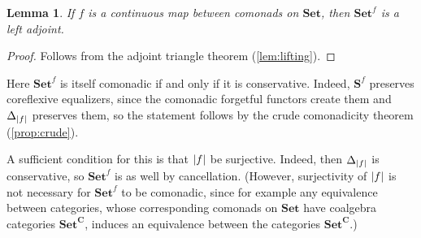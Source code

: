 \documentclass[11pt, oneside, article]{memoir}
\theoremstyle{plain}
\newtheorem{lemma}[theorem]{Lemma}
\theoremstyle{definition}
\theoremstyle{remark}
\newenvironment{remark}
{\renewcommand\qedsymbol{$\lrcorner$}%
  \pushQED{\qed}\myremark}
{\popQED\endmyremark}
\DeclarePairedDelimiter{\abs}{\lvert}{\rvert}
\newcommand{\namedcat}[1]{\mathbf{#1}}
\newcommand{\cat}[1]{\mathbf{#1}}
\newcommand{\Set}{\namedcat{Set}}
\newcommand{\pts}[1]{{\abs{#1}}}
\newcommand{\one}[1]{\pts{#1}}
\newcommand{\reindex}[1]{\Delta_{#1}}
\newcommand{\con}[2]{{#1}^{#2}}
\newcommand{\cmnd}[1]{{#1}}
\newcommand{\xX}{X}
\newcommand{\xY}{Y}
\newcommand{\cC}{\cmnd{C}}
\newcommand{\cD}{\cmnd{D}}
\newcommand{\bC}{\cat{C}}
\newcommand{\bS}{\cat{S}}
\begin{document}

\begin{lemma}\label{lem:conleft}
  If $f$ is a continuous map between comonads on $\Set$, then
  $\con{\Set}{f}$ is a left adjoint.
\end{lemma}
\begin{proof}
  Follows from the adjoint triangle theorem (\cref{lem:lifting}).
\end{proof}

\begin{remark}\label{rem:concomonadic}
  Here $\con{\Set}{f}$ is itself comonadic if and only if it is
  conservative. Indeed, $\con{\bS}{f}$ preserves coreflexive
  equalizers, since the comonadic forgetful functors create them and
  $\reindex{\one{f}}$ preserves them, so the statement follows by the
  crude comonadicity theorem (\cref{prop:crude}).
  
  A sufficient condition for this is that $\one{f}$ be
  surjective. Indeed, then $\reindex{\one{f}}$ is conservative, so
  $\con{\Set}{f}$ is as well by cancellation. (However, surjectivity
  of $\one{f}$ is not necessary for $\con{\Set}{f}$ to be comonadic,
  since for example any equivalence between categories, whose
  corresponding comonads on $\Set$ have coalgebra categories
  $\Set^{\bC}$, induces an equivalence between the categories
  $\Set^{\bC}$.)
\end{remark}
\end{document}

